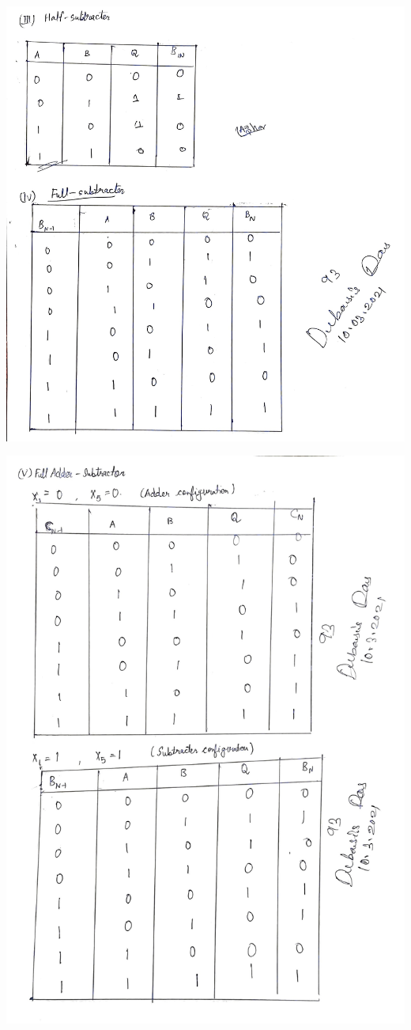 \begin{center}
    \includegraphics[scale = 0.14]{exp5tab1.5_1.jpg}
\end{center}
\begin{center}
    \includegraphics[scale = 0.2]{exp5tab2_1.jpg}
\end{center}
